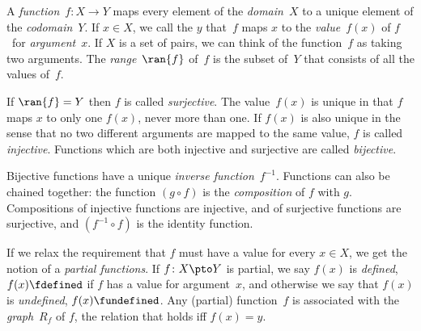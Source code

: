 A \emph{function}~$f\colon X \to Y$ maps every element of the
\emph{domain}~$X$ to a unique element of the \emph{codomain}~$Y$. If
$x \in X$, we call the $y$ that~$f$ maps $x$ to the
\emph{value}~$f(x)$ of $f$~for \emph{argument}~$x$. If $X$ is a set of
pairs, we can think of the function~$f$ as taking two arguments. The
\emph{range}~$\ran{f}$ of~$f$ is the subset of~$Y$ that consists of
all the values of~$f$.

If $\ran{f} = Y$ then $f$ is called \emph{surjective}. The value~$f(x)$
is unique in that $f$ maps $x$ to only one $f(x)$, never more than one.
If $f(x)$ is also unique in the sense that no two different arguments
are mapped to the same value, $f$ is called \emph{injective}. Functions
which are both injective and surjective are called \emph{bijective}.

Bijective functions have a unique \emph{inverse function}~$f^{-1}$.
Functions can also be chained together: the function $(g \circ f)$ is
the \emph{composition} of $f$ with $g$. Compositions of injective
functions are injective, and of surjective functions are surjective,
and $(f^{-1} \circ f)$ is the identity function.

If we relax the requirement that $f$ must have a value for every $x
\in X$, we get the notion of a \emph{partial functions}. If $f\colon
X \pto Y$ is partial, we say $f(x)$ is \emph{defined},
$f(x) \fdefined$ if $f$ has a value for argument~$x$, and otherwise we
say that $f(x)$ is \emph{undefined}, $f(x) \fundefined$. Any (partial)
function~$f$ is associated with the \emph{graph}~$R_f$ of $f$, the
relation that holds iff $f(x) = y$.
